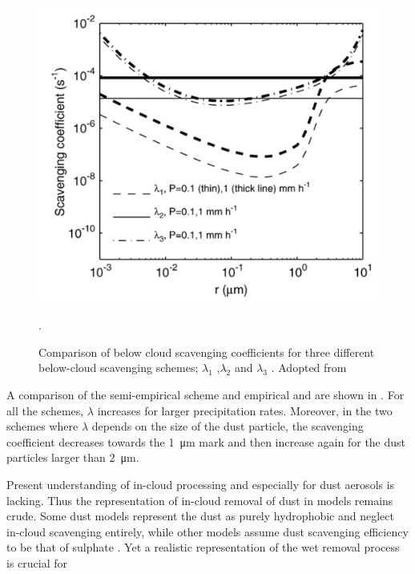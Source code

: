 \begin{figure}[htpb]
    \centering
    \includegraphics[draft=False,scale=.5]{texfiles/figs/Scavenging.PNG}
    \caption{Comparison of below cloud scavenging coefficients for three different below-cloud scavenging schemes; $\lambda_1$ \textcite{jung2006intercomparison},$\lambda_2$ \textcite{brandt2002modelling} and $\lambda_3$ \textcite{laakso2003ultrafine}. Adopted from \textcite{jung2006intercomparison}}.
    \label{fig:scavenging}
\end{figure}
A comparison of the semi-empirical \textcite{ShaoYaping2008PaMo} scheme and empirical \textcite{brandt2002modelling} and \textcite{laakso2003ultrafine} are shown in . For all the schemes, $\lambda$ increases for larger precipitation rates. Moreover, in the two schemes where $\lambda$ depends on the size of the dust particle, the scavenging coefficient decreases towards the \SI{1}{\micro\metre} mark and then increase again for the dust particles larger than \SI{2}{\micro\metre}.

Present understanding of in-cloud processing and especially for dust aerosols is lacking. Thus the representation of in-cloud removal of dust in models remains crude. Some dust models represent the dust as purely hydrophobic and neglect in-cloud scavenging entirely, while other models assume dust scavenging efficiency to be that of sulphate \parencite{bergametti2014dust}. Yet a realistic representation of the wet removal process is crucial for  

